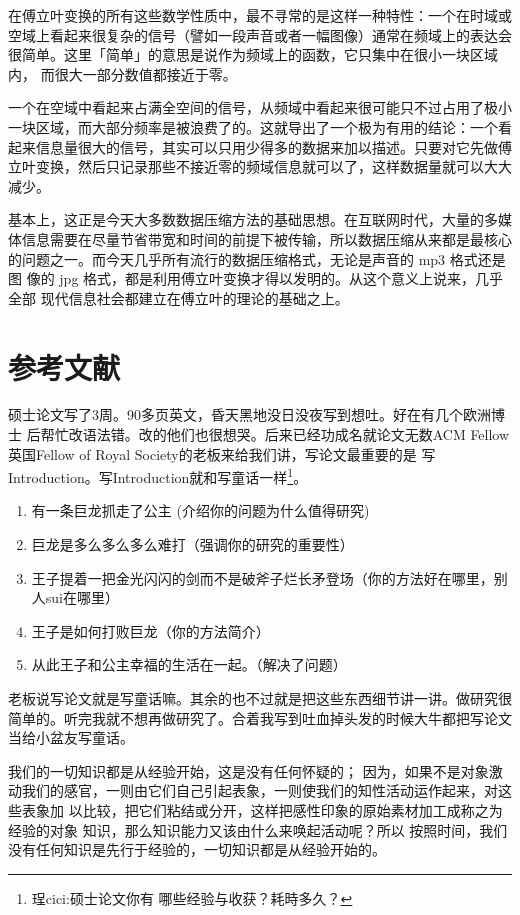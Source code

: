 在傅立叶变换的所有这些数学性质中，最不寻常的是这样一种特性：一个在时域或
空域上看起来很复杂的信号（譬如一段声音或者一幅图像）通常在频域上的表达会
很简单。这里「简单」的意思是说作为频域上的函数，它只集中在很小一块区域内，
而很大一部分数值都接近于零。

一个在空域中看起来占满全空间的信号，从频域中看起来很可能只不过占用了极小
一块区域，而大部分频率是被浪费了的。这就导出了一个极为有用的结论：一个看
起来信息量很大的信号，其实可以只用少得多的数据来加以描述。只要对它先做傅
立叶变换，然后只记录那些不接近零的频域信息就可以了，这样数据量就可以大大
减少。

基本上，这正是今天大多数数据压缩方法的基础思想。在互联网时代，大量的多媒
体信息需要在尽量节省带宽和时间的前提下被传输，所以数据压缩从来都是最核心
的问题之一。而今天几乎所有流行的数据压缩格式，无论是声音的 mp3 格式还是图
像的 jpg 格式，都是利用傅立叶变换才得以发明的。从这个意义上说来，几乎全部
现代信息社会都建立在傅立叶的理论的基础之上。



\section{参考文献}


硕士论文写了3周。90多页英文，昏天黑地没日没夜写到想吐。好在有几个欧洲博士
后帮忙改语法错。改的他们也很想哭。后来已经功成名就论文无数ACM
Fellow英国Fellow of Royal Society的老板来给我们讲，写论文最重要的是
写Introduction。写Introduction就和写童话一样\footnote{珵cici:硕士论文你有
  哪些经验与收获？耗時多久？}。

\begin{enumerate}[1.]
\item 有一条巨龙抓走了公主 (介绍你的问题为什么值得研究)
\item 巨龙是多么多么多么难打（强调你的研究的重要性）
\item 王子提着一把金光闪闪的剑而不是破斧子烂长矛登场（你的方法好在哪里，别人sui在哪里）
\item 王子是如何打败巨龙（你的方法简介）
\item 从此王子和公主幸福的生活在一起。（解决了问题）
\end{enumerate}

老板说写论文就是写童话嘛。其余的也不过就是把这些东西细节讲一讲。做研究很
简单的。听完我就不想再做研究了。合着我写到吐血掉头发的时候大牛都把写论文
当给小盆友写童话。


我们的一切知识都是从经验开始，这是没有任何怀疑的；
因为，如果不是对象激动我们的感官，一则由它们自己引起表象，一则使我们的知性活动运作起来，对这些表象加
以比较，把它们粘结或分开，这样把感性印象的原始素材加工成称之为经验的对象
知识，那么知识能力又该由什么来唤起活动呢？所以
按照时间，我们没有任何知识是先行于经验的，一切知识都是从经验开始的。

